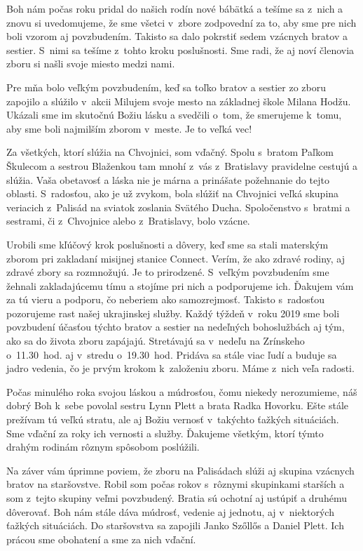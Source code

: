 Boh nám počas roku pridal do našich rodín nové {\bi bábätká} a tešíme sa z~nich a znovu si uvedomujeme, že sme všetci v~zbore zodpovední za to, aby sme pre nich boli vzorom aj povzbudením. Takisto sa dalo {\bi pokrstiť} sedem vzácnych bratov a sestier. S~nimi sa tešíme z~tohto kroku poslušnosti. Sme radi, že aj noví členovia zboru si našli svoje miesto medzi nami.

Pre mňa bolo veľkým povzbudením, keď sa toľko bratov a sestier zo zboru zapojilo a slúžilo v~akcii {\bi Milujem svoje mesto} na základnej škole Milana Hodžu. Ukázali sme im skutočnú Božiu lásku a svedčili o~tom, že smerujeme k~tomu, aby sme boli najmilším zborom v~meste. Je to veľká vec!

Za všetkých, ktorí slúžia na Chvojnici, som vďačný. Spolu s~bratom Paľkom Škulecom a sestrou Blaženkou tam mnohí z~vás z~Bratislavy pravidelne cestujú a slúžia. Vaša obetavosť a láska nie je márna a prinášate požehnanie do tejto oblasti. S~radosťou, ako je už zvykom, bola slúžiť na Chvojnici veľká skupina veriacich z~Palisád na sviatok zoslania Svätého Ducha. Spoločenstvo s~bratmi a sestrami, či z~Chvojnice alebo z~Bratislavy, bolo vzácne.

Urobili sme kľúčový krok poslušnosti a dôvery, keď sme sa stali materským zborom pri zakladaní misijnej stanice {\bi Connect}. Verím, že ako zdravé rodiny, aj zdravé zbory sa rozmnožujú. Je to prirodzené. S~veľkým povzbudením sme žehnali zakladajúcemu tímu a stojíme pri nich a podporujeme ich. Ďakujem vám za tú vieru a podporu, čo neberiem ako samozrejmosť. Takisto s~radosťou pozorujeme rast našej {\bi ukrajinskej služby}. Každý týždeň v~roku 2019 sme boli povzbudení účasťou týchto bratov a sestier na nedeľných bohoslužbách aj tým, ako sa do života zboru zapájajú. Stretávajú sa v~nedeľu na Zrínskeho o~11.30~hod. aj v~stredu o~19.30~hod. Pridáva sa stále viac ľudí a buduje sa jadro vedenia, čo je prvým krokom k~založeniu zboru. Máme z~nich veľa radosti.

Počas minulého roka svojou láskou a múdrosťou, čomu niekedy nerozumieme, náš dobrý Boh k~sebe povolal sestru Lynn Plett a brata Radka Hovorku. Ešte stále prežívam tú veľkú stratu, ale aj Božiu vernosť v~takýchto ťažkých situáciách. Sme vďační za roky ich vernosti a služby. Ďakujeme všetkým, ktorí týmto drahým rodinám rôznym spôsobom poslúžili.

Na záver vám úprimne poviem, že zboru na Palisádach slúži aj skupina vzácnych bratov na {\bi staršovstve}. Robil som počas rokov s~rôznymi skupinkami starších a som z~tejto skupiny veľmi povzbudený. Bratia sú ochotní aj ustúpiť a druhému dôverovať. Boh nám stále dáva múdrosť, vedenie aj jednotu, aj v~niektorých ťažkých situáciách. Do staršovstva sa zapojili Janko Szőllős a Daniel Plett. Ich prácou sme obohatení a sme za nich vďační.

